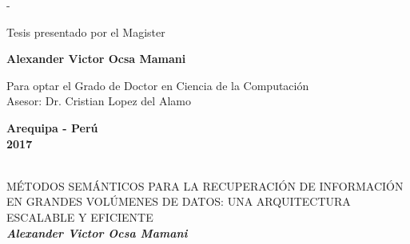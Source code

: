 \begin{titlingpage}
\begin{SingleSpace}
\begin{adjustwidth*}{\unitlength}{-\unitlength}
\begin{center}
\begin{center}
\end{center} 


\vspace*{1.5cm}
\begin{flushright}
 
\small{Tesis presentado por el Magister\\
\vspace*{0.15cm}

\textbf{Alexander Victor Ocsa Mamani}\\
\vspace*{0.2cm}

Para optar el Grado de Doctor en Ciencia de la Computación\\
\vspace*{0.15cm}
Asesor: Dr. Cristian Lopez del Alamo}
 
\end{flushright}

\vspace*{2.5cm}
\begin{center}
\small
\textbf{Arequipa - Perú \\2017}
\end{center}
\cleardoublepage

\end{center}
\end{adjustwidth*}
\end{SingleSpace}
\end{titlingpage}



\newpage





\vfill

\vspace*{5cm}

\begin{center}
\begin{minipage}[c]{12cm}
\begin{center}
\hrulefill\\
\vspace{.5cm} {\large MÉTODOS SEMÁNTICOS PARA LA RECUPERACIÓN DE INFORMACIÓN EN GRANDES VOLÚMENES DE DATOS: UNA ARQUITECTURA ESCALABLE Y EFICIENTE}\\
\vspace{1.3cm}
\small\textbf{\it Alexander Victor Ocsa Mamani}\\
\vspace{.5cm}
\hrulefill\\
\end{center}
\end{minipage}
\end{center}

\vfill

 



 